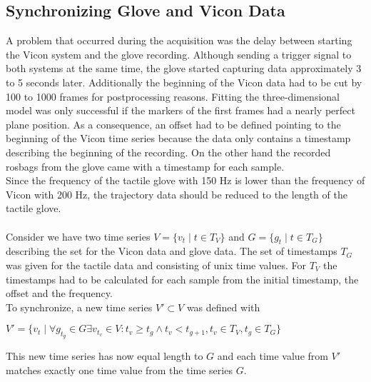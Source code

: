 \subsection{Synchronizing Glove and Vicon Data}
A problem that occurred during the acquisition was the delay between starting the Vicon system and the glove recording. Although sending a trigger signal to both systems at the same time, the glove started capturing data approximately 3 to 5 seconds later. Additionally the beginning of the Vicon data had to be cut by 100 to 1000 frames for postprocessing reasons. Fitting the three-dimensional model was only successful if the markers of the first frames had a nearly perfect plane position. As a consequence, an offset had to be defined pointing to the beginning of the Vicon time series because the data only contains a timestamp describing the beginning of the recording. On the other hand the recorded rosbags from the glove came with a timestamp for each sample.\\
Since the frequency of the tactile glove with 150 Hz is lower than the frequency of Vicon with 200 Hz, the trajectory data should be reduced to the length of the tactile glove.\\
\\
Consider we have two time series $V = \{v_{t} \mid t\in T_{V}\}$ and $G = \{g_{t} \mid t\in T_{G}\}$ describing the set for the Vicon data and glove data. The set of timestamps $T_{G}$ was given for the tactile data and consisting of unix time values. For $T_{V}$ the timestamps had to be calculated for each sample from the initial timestamp, the offset and the frequency. \\
To synchronize, a new time series $V' \subset V$ was defined with \begin{center}
$V' = \{v_{t} \mid \forall g_{t_{g}} \in G \exists v_{t_{v}} \in V : t_{v} \geq t_{g} \wedge t_{v} < t_{g+1}, t_{v} \in T_{V}, t_{g} \in T_{G} \}$
\end{center}
This new time series has now equal length to $G$ and each time value from $V'$ matches exactly one time value from the time series $G$.
